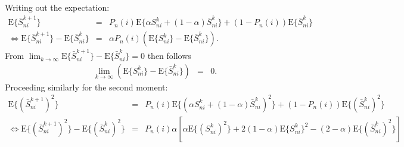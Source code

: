 Writing out the expectation:
\begin{eqnarray}
\text{E}\{\bar{S}_{ni}^{k+1}\} & = & P_{n}(i)\text{E}\{\alpha S_{ni}^{k}+(1-\alpha)\bar{S}_{ni}^{k}\}+(1-P_{n}(i))\text{E}\{\bar{S}_{ni}^{k}\}\\
\Leftrightarrow\text{E}\{\bar{S}_{ni}^{k+1}\}-\text{E}\{\bar{S}_{ni}^{k}\} & = & \alpha P_{n}(i)(\text{E}\{S_{ni}^{k}\}-\text{E}\{\bar{S}_{ni}^{k}\}).
\end{eqnarray}
From $\lim_{k\rightarrow\infty}\text{E}\{\bar{S}_{ni}^{k+1}\}-\text{E}\{\bar{S}_{ni}^{k}\}=0$
then follows
\begin{eqnarray}
\lim_{k\rightarrow\infty}\left(\text{E}\{S_{ni}^{k}\}-\text{E}\{\bar{S}_{ni}^{k}\}\right) & = & 0. \label{eq:first-score-moment}
\end{eqnarray}
%
Proceeding similarly for the second moment:
\begin{eqnarray}
\text{E}\{(\bar{S}_{ni}^{k+1})^{2}\} 
& = & 
P_{n}(i)\text{E}\{(\alpha S_{ni}^{k}+(1-\alpha)\bar{S}_{ni}^{k})^{2}\}+(1-P_{n}(i))\text{E}\{(\bar{S}_{ni}^{k})^{2}\}\\
\Leftrightarrow
\text{E}\{(\bar{S}_{ni}^{k+1})^{2}\}-\text{E}\{(\bar{S}_{ni}^{k})^{2}\} 
& = & P_{n}(i) \alpha \left[\alpha\text{E}\{(S_{ni}^{k})^{2}\}+2(1-\alpha)\text{E}\{S_{ni}^{k}\}^{2}-(2-\alpha)\text{E}\{(\bar{S}_{ni}^{k})^{2}\}\right]
\end{eqnarray}

